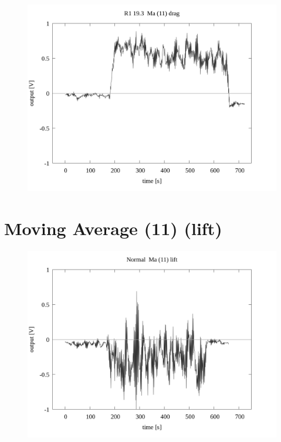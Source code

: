 \documentclass[a4paper]{jsarticle}
\begin{document}
\begin{figure}[htbp]
    \footnotesize
    \begin{center}
        \includegraphics[width=140mm]{../../../33_result/210806/moving_average/11/drag/01/R1_19.3_ma(11)_drag_01.png}
    \end{center}
\end{figure}

\section{Moving Average (11) (lift)}

\begin{figure}[htbp]
    \footnotesize
    \begin{center}
        \includegraphics[width=140mm]{../../../33_result/210806/moving_average/11/lift/01/Normal_ma(11)_lift_01.png}
    \end{center}
\end{figure}
\end{document}
